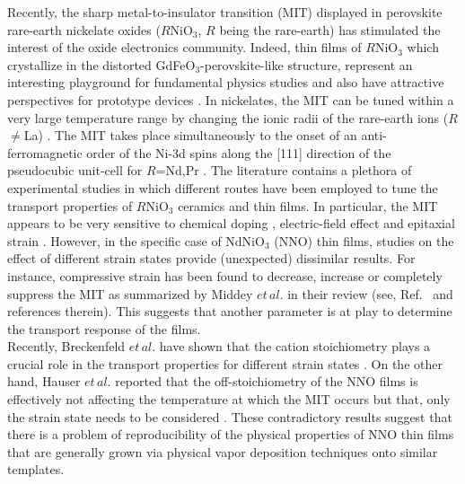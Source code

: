\documentclass[aip,graphicx,numerical]{revtex4-1}
\begin{document}
Recently, the sharp metal-to-insulator transition (MIT) displayed in perovskite rare-earth nickelate oxides ($\textit{R}$NiO$_3$, $R$ being the rare-earth) has stimulated the interest of the oxide electronics community. Indeed, thin films of $\textit{R}$NiO$_3$ which crystallize in the distorted GdFeO$_3$-perovskite-like structure, represent an interesting playground for fundamental physics studies \cite{Medarde_1997} and also have attractive perspectives for prototype devices \cite{Scherwitzl_2010} . In nickelates, the MIT can be tuned within a very large temperature range by changing the ionic radii of the rare-earth ions ($\textit{R}$$\neq$La) \cite{Lacorre1991} . The MIT takes place simultaneously to the onset of an anti-ferromagnetic order of the Ni-3d spins along the [111] direction of the pseudocubic unit-cell for $\textit{R}$=Nd,Pr \cite{PhysRevB.46.4414} . The literature contains a plethora of experimental studies in which different routes have been employed to tune the transport properties of $\textit{R}$NiO$_3$ ceramics and thin films. In particular, the MIT appears to be very sensitive to chemical doping \cite{Garc_a_Mu_oz_1995, Lian_2013} , electric-field effect \cite{Scherwitzl_2010,Yang2011} and epitaxial strain\cite{ZhangStrainNNO, LiuStrainNNO, Scherwitzl_2010, PhysRevB-Bruno} . 
However, in the specific case of NdNiO$_3$ (NNO) thin films, studies on the effect of different strain states provide (unexpected) dissimilar results. For instance, compressive strain has been found to decrease, increase or completely suppress the MIT as summarized by Middey $et\,al.$ in their review (see, Ref.~\cite{Middey_2016} and references therein). This suggests that another parameter is at play to determine the transport response of the films.\\Recently, Breckenfeld $et\,al.$ have shown that the cation stoichiometry plays a crucial role in the transport properties for different strain states\cite{Breckenfeld_2014} . On the other hand, Hauser $et\,al.$ reported that the off-stoichiometry of the NNO films is effectively not affecting the temperature at which the MIT occurs but that, only the strain state needs to be considered\cite{Hauser_2015} . These contradictory results suggest that there is a problem of reproducibility of the physical properties of NNO thin films that are generally grown via physical vapor deposition techniques onto similar templates. \\
$$
\end{document}
